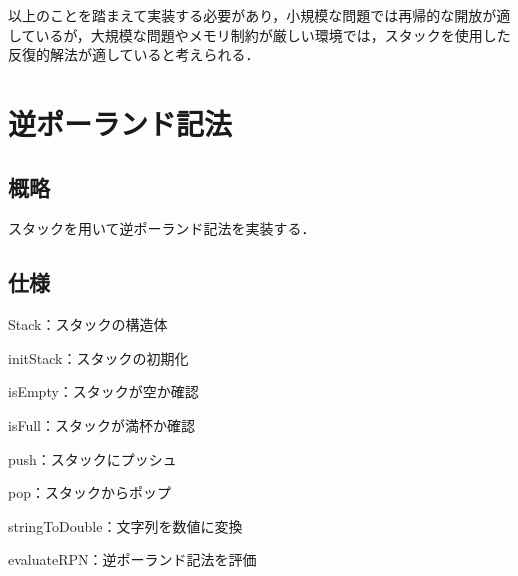 \documentclass{ltjsarticle}
\begin{document}
以上のことを踏まえて実装する必要があり，小規模な問題では再帰的な開放が適しているが，大規模な問題やメモリ制約が厳しい環境では，スタックを使用した反復的解法が適していると考えられる．

\section{逆ポーランド記法}
\subsection{概略}
スタックを用いて逆ポーランド記法を実装する．

\subsection{仕様}
\noindent Stack：スタックの構造体

\noindent initStack：スタックの初期化

\noindent isEmpty：スタックが空か確認

\noindent isFull：スタックが満杯か確認

\noindent push：スタックにプッシュ

\noindent pop：スタックからポップ

\noindent stringToDouble：文字列を数値に変換

\noindent evaluateRPN：逆ポーランド記法を評価
\end{document}
